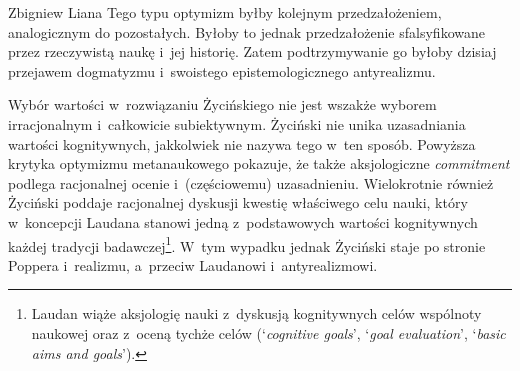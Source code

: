 \begin{artplenv}{Zbigniew Liana}
Tego typu optymizm byłby kolejnym przedzałożeniem, analogicznym do pozostałych. Byłoby to jednak przedzałożenie sfalsyfikowane przez rzeczywistą naukę i~jej historię. Zatem podtrzymywanie go byłoby dzisiaj przejawem dogmatyzmu i~swoistego epistemologicznego antyrealizmu.

Wybór wartości w~rozwiązaniu Życińskiego nie jest wszakże wyborem irracjonalnym i~całkowicie subiektywnym. Życiński nie unika uzasadniania wartości kognitywnych, jakkolwiek nie nazywa tego w~ten sposób. Powyższa krytyka optymizmu metanaukowego pokazuje, że także aksjologiczne \textit{commitment} podlega racjonalnej ocenie i~(częściowemu) uzasadnieniu. Wielokrotnie również Życiński poddaje racjonalnej dyskusji kwestię właściwego celu nauki, który w~koncepcji Laudana stanowi jedną z~podstawowych wartości kognitywnych każdej tradycji badawczej\footnote{Laudan
\parencite*[][s.~44n]{laudan_science_1984} %
 wiąże aksjologię nauki z~dyskusją kognitywnych celów wspólnoty naukowej oraz z~oceną tychże celów (‘\textit{cognitive goals}', ‘\textit{goal evaluation}', ‘\textit{basic aims and goals}').}. W~tym wypadku jednak Życiński staje po stronie Poppera i~realizmu, a~przeciw Laudanowi i~antyrealizmowi.


\end{artplenv}
